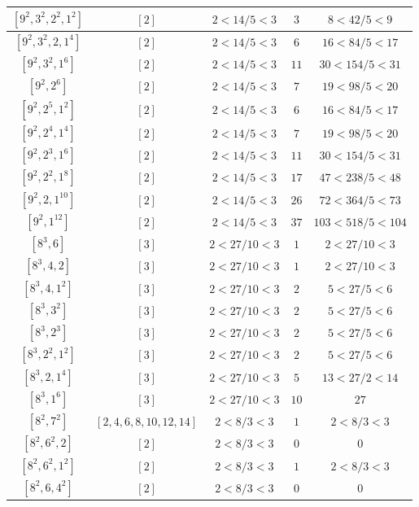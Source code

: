 \documentclass{article}%
\begin{document}
\begin{center}
\begin{longtable}{||c|c|c|c|c||}
$[9^{2}, 3^{2}, 2^{2}, 1^{2}]$ & $[2]$ & $2 < 14/5 < 3$ & $3$ & $8 < 42/5 < 9$ \\ \hline 
$[9^{2}, 3^{2}, 2, 1^{4}]$ & $[2]$ & $2 < 14/5 < 3$ & $6$ & $16 < 84/5 < 17$ \\ \hline 
$[9^{2}, 3^{2}, 1^{6}]$ & $[2]$ & $2 < 14/5 < 3$ & $11$ & $30 < 154/5 < 31$ \\ \hline 
$[9^{2}, 2^{6}]$ & $[2]$ & $2 < 14/5 < 3$ & $7$ & $19 < 98/5 < 20$ \\ \hline 
$[9^{2}, 2^{5}, 1^{2}]$ & $[2]$ & $2 < 14/5 < 3$ & $6$ & $16 < 84/5 < 17$ \\ \hline 
$[9^{2}, 2^{4}, 1^{4}]$ & $[2]$ & $2 < 14/5 < 3$ & $7$ & $19 < 98/5 < 20$ \\ \hline 
$[9^{2}, 2^{3}, 1^{6}]$ & $[2]$ & $2 < 14/5 < 3$ & $11$ & $30 < 154/5 < 31$ \\ \hline 
$[9^{2}, 2^{2}, 1^{8}]$ & $[2]$ & $2 < 14/5 < 3$ & $17$ & $47 < 238/5 < 48$ \\ \hline 
$[9^{2}, 2, 1^{10}]$ & $[2]$ & $2 < 14/5 < 3$ & $26$ & $72 < 364/5 < 73$ \\ \hline 
$[9^{2}, 1^{12}]$ & $[2]$ & $2 < 14/5 < 3$ & $37$ & $103 < 518/5 < 104$ \\ \hline 
$[8^{3}, 6]$ & $[3]$ & $2 < 27/10 < 3$ & $1$ & $2 < 27/10 < 3$ \\ \hline 
$[8^{3}, 4, 2]$ & $[3]$ & $2 < 27/10 < 3$ & $1$ & $2 < 27/10 < 3$ \\ \hline 
$[8^{3}, 4, 1^{2}]$ & $[3]$ & $2 < 27/10 < 3$ & $2$ & $5 < 27/5 < 6$ \\ \hline 
$[8^{3}, 3^{2}]$ & $[3]$ & $2 < 27/10 < 3$ & $2$ & $5 < 27/5 < 6$ \\ \hline 
$[8^{3}, 2^{3}]$ & $[3]$ & $2 < 27/10 < 3$ & $2$ & $5 < 27/5 < 6$ \\ \hline 
$[8^{3}, 2^{2}, 1^{2}]$ & $[3]$ & $2 < 27/10 < 3$ & $2$ & $5 < 27/5 < 6$ \\ \hline 
$[8^{3}, 2, 1^{4}]$ & $[3]$ & $2 < 27/10 < 3$ & $5$ & $13 < 27/2 < 14$ \\ \hline 
$[8^{3}, 1^{6}]$ & $[3]$ & $2 < 27/10 < 3$ & $10$ & $27$ \\ \hline 
$[8^{2}, 7^{2}]$ & $[2, 4, 6, 8, 10, 12, 14]$ & $2 < 8/3 < 3$ & $1$ & $2 < 8/3 < 3$ \\ \hline 
$[8^{2}, 6^{2}, 2]$ & $[2]$ & $2 < 8/3 < 3$ & $0$ & $0$ \\ \hline 
$[8^{2}, 6^{2}, 1^{2}]$ & $[2]$ & $2 < 8/3 < 3$ & $1$ & $2 < 8/3 < 3$ \\ \hline 
$[8^{2}, 6, 4^{2}]$ & $[2]$ & $2 < 8/3 < 3$ & $0$ & $0$ \\ \hline 

\end{longtable}
\end{center}
\end{document}
